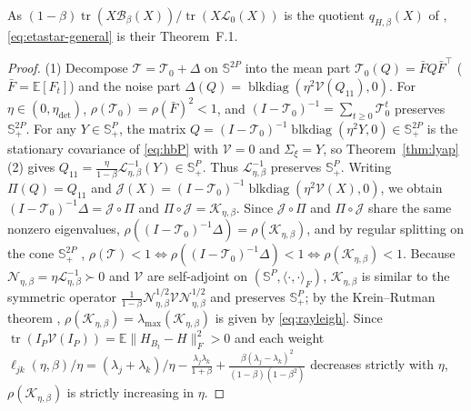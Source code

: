 \documentclass[11pt]{article}
\theoremstyle{remark}
\newcommand{\E}{\mathbb{E}}
\newcommand{\tr}{\operatorname{tr}}
\begin{document}
As $(1-\beta)\tr(X\mathcal B_\beta(X))/\tr(X\mathcal L_0(X))$ is the quotient $q_{H,\beta}(X)$ of \citet{cai2026llm}, \eqref{eq:etastar-general} is their Theorem~F.1.
\begin{proof}
(1) Decompose $\mathcal T = \mathcal T_0 + \Delta$ on $\mathbb S^{2P}$ into the mean part $\mathcal T_0(Q) = \bar F Q \bar F^\top$ ($\bar F = \E[F_t]$) and the noise part $\Delta(Q) = \operatorname{blkdiag}(\eta^2\mathcal V(Q_{11}), 0)$. For $\eta \in (0,\eta_{\mathrm{det}})$, $\rho(\mathcal T_0) = \rho(\bar F)^2 < 1$, and $(I-\mathcal T_0)^{-1} = \sum_{t\ge 0}\mathcal T_0^t$ preserves $\mathbb S^{2P}_+$. For any $Y \in \mathbb S^P_+$, the matrix $Q = (I-\mathcal T_0)^{-1}\operatorname{blkdiag}(\eta^2 Y, 0) \in \mathbb S^{2P}_+$ is the stationary covariance of \eqref{eq:hbP} with $\mathcal V = 0$ and $\Sigma_\xi = Y$, so Theorem~\ref{thm:lyap}(2) gives $Q_{11} = \frac{\eta}{1-\beta}\mathcal L_{\eta,\beta}^{-1}(Y) \in \mathbb S^P_+$. Thus $\mathcal L_{\eta,\beta}^{-1}$ preserves $\mathbb S^P_+$. Writing $\Pi(Q) = Q_{11}$ and $\mathcal J(X) = (I-\mathcal T_0)^{-1}\operatorname{blkdiag}(\eta^2\mathcal V(X),0)$, we obtain $(I-\mathcal T_0)^{-1}\Delta = \mathcal J \circ \Pi$ and $\Pi \circ \mathcal J = \mathcal K_{\eta,\beta}$. Since $\mathcal J\circ\Pi$ and $\Pi\circ\mathcal J$ share the same nonzero eigenvalues, $\rho((I-\mathcal T_0)^{-1}\Delta) = \rho(\mathcal K_{\eta,\beta})$, and by regular splitting on the cone $\mathbb S^{2P}_+$ \citep{berman1994}, $\rho(\mathcal T) < 1 \iff \rho((I-\mathcal T_0)^{-1}\Delta) < 1 \iff \rho(\mathcal K_{\eta,\beta}) < 1$. Because $\mathcal N_{\eta,\beta} = \eta\mathcal L_{\eta,\beta}^{-1} \succ 0$ and $\mathcal V$ are self-adjoint on $(\mathbb S^P, \langle\cdot,\cdot\rangle_F)$, $\mathcal K_{\eta,\beta}$ is similar to the symmetric operator $\frac{1}{1-\beta}\mathcal N_{\eta,\beta}^{1/2}\mathcal V\mathcal N_{\eta,\beta}^{1/2}$ and preserves $\mathbb S^P_+$; by the Krein--Rutman theorem \citep{krein1948linear}, $\rho(\mathcal K_{\eta,\beta}) = \lambda_{\max}(\mathcal K_{\eta,\beta})$ is given by \eqref{eq:rayleigh}. Since $\tr(I_P\mathcal V(I_P)) = \E\|H_{B_t}-H\|_F^2 > 0$ and each weight $\ell_{jk}(\eta,\beta)/\eta = (\lambda_j+\lambda_k)/\eta - \frac{\lambda_j\lambda_k}{1+\beta} + \frac{\beta(\lambda_j-\lambda_k)^2}{(1-\beta)(1-\beta^2)}$ decreases strictly with $\eta$, $\rho(\mathcal K_{\eta,\beta})$ is strictly increasing in $\eta$.


\end{proof}
\end{document}
